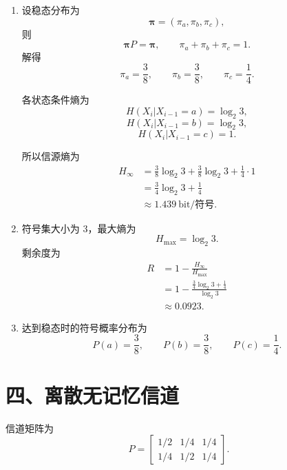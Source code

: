 \documentclass[UTF8,a4paper,12pt]{ctexart}
\begin{document}
\begin{enumerate}[label=\arabic*., leftmargin=2em]
\item 设稳态分布为
\[
\boldsymbol{\pi}=(\pi_a,\pi_b,\pi_c),
\]
则
\[
\boldsymbol{\pi}P=\boldsymbol{\pi},\qquad
\pi_a+\pi_b+\pi_c=1.
\]
解得
\[
\pi_a=\frac38,\qquad
\pi_b=\frac38,\qquad
\pi_c=\frac14.
\]

各状态条件熵为
\[
H(X_i|X_{i-1}=a)=\log_2 3,
\]
\[
H(X_i|X_{i-1}=b)=\log_2 3,
\]
\[
H(X_i|X_{i-1}=c)=1.
\]

所以信源熵为
\[
\begin{aligned}
H_\infty
&=\frac38\log_2 3+\frac38\log_2 3+\frac14\cdot 1\\
&=\frac34\log_2 3+\frac14\\
&\approx 1.439\ \text{bit/符号}.
\end{aligned}
\]

\item 符号集大小为 $3$，最大熵为
\[
H_{\max}=\log_2 3.
\]
剩余度为
\[
\begin{aligned}
R
&=1-\frac{H_\infty}{H_{\max}}\\
&=1-\frac{\frac34\log_2 3+\frac14}{\log_2 3}\\
&\approx 0.0923.
\end{aligned}
\]

\item 达到稳态时的符号概率分布为
\[
P(a)=\frac38,\qquad
P(b)=\frac38,\qquad
P(c)=\frac14.
\]
\end{enumerate}

\section*{四、离散无记忆信道}

信道矩阵为
\[
P=
\begin{bmatrix}
1/2&1/4&1/4\\
1/4&1/2&1/4
\end{bmatrix}.
\]
\end{document}
